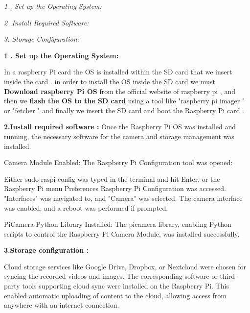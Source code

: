 \documentclass[11pt]{article}
\begin{document}
    \textit{1 . Set up the Operating System:}

    
    \textit{2 .Install Required Software:}

    
    \textit{3. Storage Configuration:}\newpage

    

    


\textbf{ 1 . Set up the Operating System:   }


\hspace{1cm} \hspace{1cm} In a raspberry Pi card the OS is installed within the SD card that we insert inside the card . in order to install the OS inside the SD card we must \textbf{Download raspberry Pi OS } from the official website of raspberry pi , and then we \textbf{flash the OS to the SD card } using a tool like "raspberry pi imager " or "fetcher " and finally we insert the SD card  and boot the Raspberry Pi card .











    \textbf{2.Install required software :}
    Once the Raspberry Pi OS was installed and running, the necessary software for the camera and storage management was installed.

Camera Module Enabled:
The Raspberry Pi Configuration tool was opened:

Either sudo raspi-config was typed in the terminal and hit Enter, or the Raspberry Pi menu  Preferences  Raspberry Pi Configuration was accessed.
"Interfaces" was navigated to, and "Camera" was selected. The camera interface was enabled, and a reboot was performed if prompted.



PiCamera Python Library Installed:
The picamera library, enabling Python scripts to control the Raspberry Pi Camera Module, was installed successfully.




\textbf{3.Storage configuration :}



\hspace{1cm} \hspace{1cm}Cloud storage services like Google Drive, Dropbox, or Nextcloud were chosen for syncing the recorded videos and images. The corresponding software or third-party tools supporting cloud sync were installed on the Raspberry Pi. This enabled automatic uploading of content to the cloud, allowing access from anywhere with an internet connection.
\end{document}
